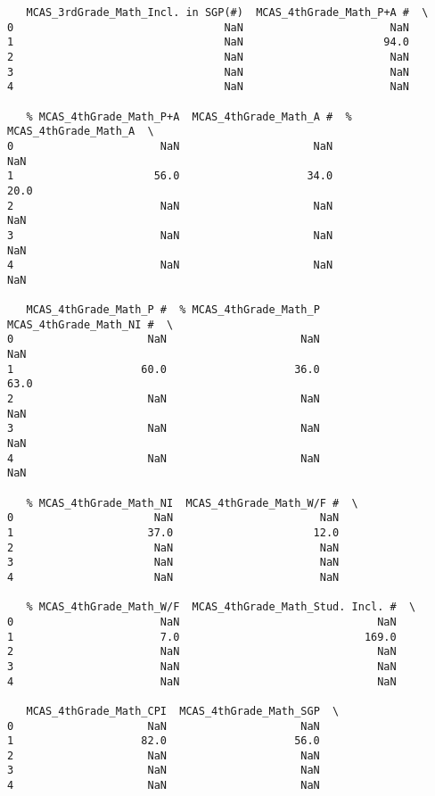 \documentclass[11pt]{article}
\begin{document}
\begin{verbatim}
   MCAS_3rdGrade_Math_Incl. in SGP(#)  MCAS_4thGrade_Math_P+A #  \
0                                 NaN                       NaN   
1                                 NaN                      94.0   
2                                 NaN                       NaN   
3                                 NaN                       NaN   
4                                 NaN                       NaN   

   % MCAS_4thGrade_Math_P+A  MCAS_4thGrade_Math_A #  % MCAS_4thGrade_Math_A  \
0                       NaN                     NaN                     NaN   
1                      56.0                    34.0                    20.0   
2                       NaN                     NaN                     NaN   
3                       NaN                     NaN                     NaN   
4                       NaN                     NaN                     NaN   

   MCAS_4thGrade_Math_P #  % MCAS_4thGrade_Math_P  MCAS_4thGrade_Math_NI #  \
0                     NaN                     NaN                      NaN   
1                    60.0                    36.0                     63.0   
2                     NaN                     NaN                      NaN   
3                     NaN                     NaN                      NaN   
4                     NaN                     NaN                      NaN   

   % MCAS_4thGrade_Math_NI  MCAS_4thGrade_Math_W/F #  \
0                      NaN                       NaN   
1                     37.0                      12.0   
2                      NaN                       NaN   
3                      NaN                       NaN   
4                      NaN                       NaN   

   % MCAS_4thGrade_Math_W/F  MCAS_4thGrade_Math_Stud. Incl. #  \
0                       NaN                               NaN   
1                       7.0                             169.0   
2                       NaN                               NaN   
3                       NaN                               NaN   
4                       NaN                               NaN   

   MCAS_4thGrade_Math_CPI  MCAS_4thGrade_Math_SGP  \
0                     NaN                     NaN   
1                    82.0                    56.0   
2                     NaN                     NaN   
3                     NaN                     NaN   
4                     NaN                     NaN   


\end{verbatim}
\end{document}
